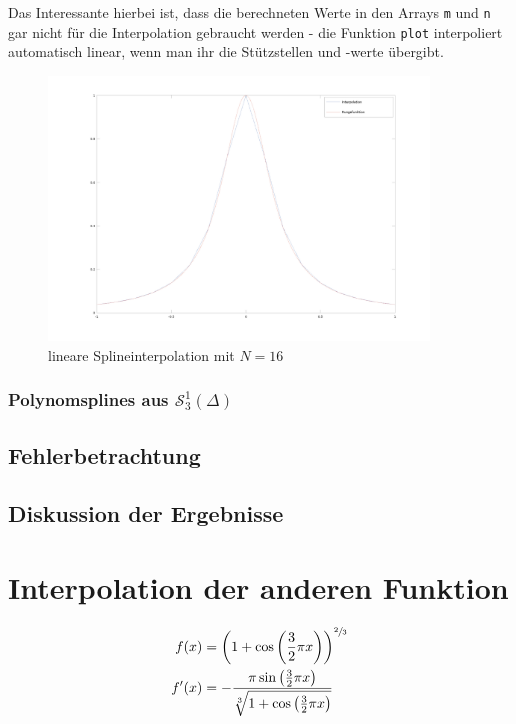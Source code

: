\documentclass[ngerman,a4paper]{texmf/tex/latex/mathscript/mathscript}
\begin{document}
	Das Interessante hierbei ist, dass die berechneten Werte in den Arrays \texttt{m} und \texttt{n} gar nicht für die Interpolation gebraucht werden - die Funktion \texttt{plot} interpoliert automatisch linear, wenn man ihr die Stützstellen und -werte übergibt.
	
	\begin{figure}[h]
		\centering
		\includegraphics[width=0.9\textwidth]{images/Runge_lineare_Interpolation.png}
		\caption{lineare Splineinterpolation mit $N=16$}
	\end{figure}
	
	\subsubsection{Polynomsplines aus $\mathcal{S}_3^1(\Delta)$}
	
	\subsection{Fehlerbetrachtung}
	
	\subsection{Diskussion der Ergebnisse}


\section{Interpolation der anderen Funktion}
	\begin{align}
		f(x) &= \left( 1+\cos\left(\frac{3}{2}\pi x \right) \right)^{\sfrac{2}{3}}\notag \\
		f'(x) &=-\frac{\pi\sin\left(\frac{3}{2}\pi x\right)}{\sqrt[3]{1+\cos\left(\frac{3}{2}\pi x \right)}}\notag
	\end{align}
	
\end{document}

